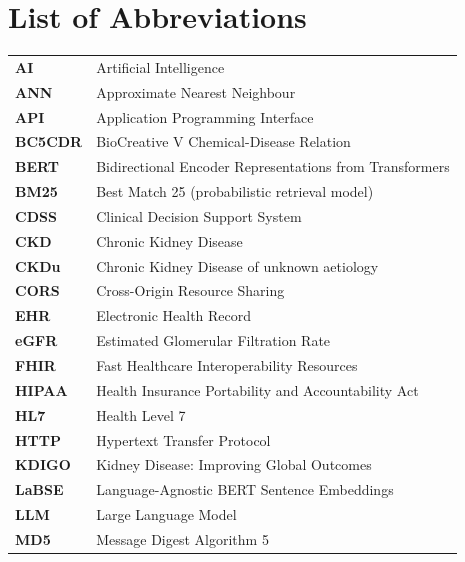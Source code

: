 \documentclass[12pt,a4paper]{report}
\begin{document}
\listoftables
{}

\newpage
\chapter*{List of Abbreviations}

\begin{tabular}{@{}lp{}@{}}
\textbf{AI}      & Artificial Intelligence \\
\textbf{ANN}     & Approximate Nearest Neighbour \\
\textbf{API}     & Application Programming Interface \\
\textbf{BC5CDR}  & BioCreative V Chemical-Disease Relation \\
\textbf{BERT}    & Bidirectional Encoder Representations from Transformers \\
\textbf{BM25}    & Best Match 25 (probabilistic retrieval model) \\
\textbf{CDSS}    & Clinical Decision Support System \\
\textbf{CKD}     & Chronic Kidney Disease \\
\textbf{CKDu}    & Chronic Kidney Disease of unknown aetiology \\
\textbf{CORS}    & Cross-Origin Resource Sharing \\
\textbf{EHR}     & Electronic Health Record \\
\textbf{eGFR}    & Estimated Glomerular Filtration Rate \\
\textbf{FHIR}    & Fast Healthcare Interoperability Resources \\
\textbf{HIPAA}   & Health Insurance Portability and Accountability Act \\
\textbf{HL7}     & Health Level 7 \\
\textbf{HTTP}    & Hypertext Transfer Protocol \\
\textbf{KDIGO}   & Kidney Disease: Improving Global Outcomes \\
\textbf{LaBSE}   & Language-Agnostic BERT Sentence Embeddings \\
\textbf{LLM}     & Large Language Model \\
\textbf{MD5}     & Message Digest Algorithm 5 \\

\end{tabular}
\end{document}
